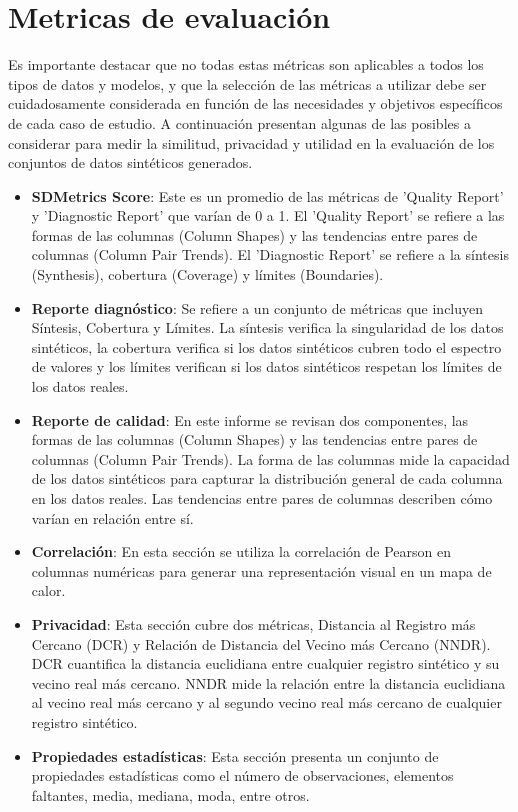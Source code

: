 \section{Metricas de evaluación}
Es importante destacar que no todas estas métricas son aplicables a todos los tipos de datos y modelos, y que la selección de las métricas a utilizar debe ser cuidadosamente considerada en función de las necesidades y objetivos específicos de cada caso de estudio.
A continuación presentan algunas de las posibles a considerar para medir la similitud, privacidad y utilidad en la evaluación de los conjuntos de datos sintéticos generados.
\begin{itemize}
\item \textbf{SDMetrics Score}: Este es un promedio de las métricas de 'Quality Report' y 'Diagnostic Report' que varían de 0 a 1. El 'Quality Report' se refiere a las formas de las columnas (Column Shapes) y las tendencias entre pares de columnas (Column Pair Trends). El 'Diagnostic Report' se refiere a la síntesis (Synthesis), cobertura (Coverage) y límites (Boundaries).
\item \textbf{Reporte diagnóstico}: Se refiere a un conjunto de métricas que incluyen Síntesis, Cobertura y Límites. La síntesis verifica la singularidad de los datos sintéticos, la cobertura verifica si los datos sintéticos cubren todo el espectro de valores y los límites verifican si los datos sintéticos respetan los límites de los datos reales.
\item \textbf{Reporte de calidad}: En este informe se revisan dos componentes, las formas de las columnas (Column Shapes) y las tendencias entre pares de columnas (Column Pair Trends). La forma de las columnas mide la capacidad de los datos sintéticos para capturar la distribución general de cada columna en los datos reales. Las tendencias entre pares de columnas describen cómo varían en relación entre sí.
\item \textbf{Correlación}: En esta sección se utiliza la correlación de Pearson en columnas numéricas para generar una representación visual en un mapa de calor.
\item \textbf{Privacidad}: Esta sección cubre dos métricas, Distancia al Registro más Cercano (DCR) y Relación de Distancia del Vecino más Cercano (NNDR). DCR cuantifica la distancia euclidiana entre cualquier registro sintético y su vecino real más cercano. NNDR mide la relación entre la distancia euclidiana al vecino real más cercano y al segundo vecino real más cercano de cualquier registro sintético.
\item \textbf{Propiedades estadísticas}: Esta sección presenta un conjunto de propiedades estadísticas como el número de observaciones, elementos faltantes, media, mediana, moda, entre otros.
\end{itemize}




